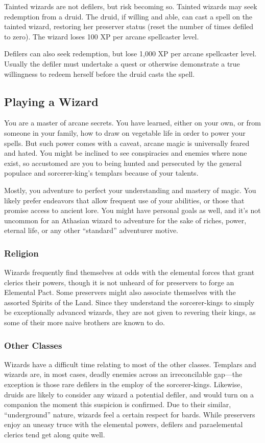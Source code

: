 Tainted wizards are not defilers, but risk becoming so. Tainted wizards may seek redemption from a druid. The druid, if willing and able, can cast a  spell on the tainted wizard, restoring her preserver status (reset the number of times defiled to zero). The wizard loses 100 XP per arcane spellcaster level.

Defilers can also seek redemption, but lose 1,000 XP per arcane spellcaster level. Usually the defiler must undertake a quest or otherwise demonstrate a true willingness to redeem herself before the druid casts the  spell.


\subsection{Playing a Wizard}
You are a master of arcane secrets. You have learned, either on your own, or from someone in your family, how to draw on vegetable life in order to power your spells. But such power comes with a caveat, arcane magic is universally feared and hated. You might be inclined to see conspiracies and enemies where none exist, so accustomed are you to being hunted and persecuted by the general populace and sorcerer-king's templars because of your talents.

Mostly, you adventure to perfect your understanding and mastery of magic. You likely prefer endeavors that allow frequent use of your abilities, or those that promise access to ancient lore. You might have personal goals as well, and it's not uncommon for an Athasian wizard to adventure for the sake of riches, power, eternal life, or any other ``standard'' adventurer motive.

\subsubsection{Religion}
Wizards frequently find themselves at odds with the elemental forces that grant clerics their powers, though it is not unheard of for preservers to forge an Elemental Pact. Some preservers might also associate themselves with the assorted Spirits of the Land. Since they understand the sorcerer-kings to simply be exceptionally advanced wizards, they are not given to revering their kings, as some of their more naive brothers are known to do.

\subsubsection{Other Classes}
Wizards have a difficult time relating to most of the other classes. Templars and wizards are, in most cases, deadly enemies across an irreconcilable gap---the exception is those rare defilers in the employ of the sorcerer-kings. Likewise, druids are likely to consider any wizard a potential defiler, and would turn on a companion the moment this suspicion is confirmed. Due to their similar, ``underground'' nature, wizards feel a certain respect for bards. While preservers enjoy an uneasy truce with the elemental powers, defilers and paraelemental clerics tend get along quite well.

